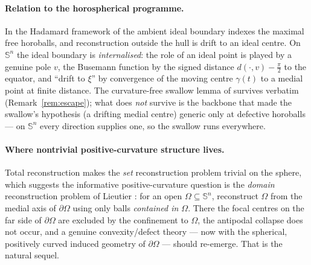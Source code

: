 \documentclass[11pt]{article}
\theoremstyle{remark}
\newcommand{\Sn}{\mathbb{S}^{n}}
\begin{document}
\paragraph{Relation to the horospherical programme.} In the Hadamard
framework of \cite{R3} the ambient ideal boundary indexes the maximal free
horoballs, and reconstruction outside the hull is drift to an ideal
centre. On $\Sn$ the ideal boundary is \emph{internalised}: the role of an
ideal point is played by a genuine pole $v$, the Busemann function by the
signed distance $d(\cdot,v)-\tfrac\pi2$ to the equator, and ``drift to
$\xi$'' by convergence of the moving centre $\gamma(t)$ to a medial point
at finite distance. The curvature-free swallow lemma of \cite{R3} survives
verbatim (Remark~\ref{rem:escape}); what does \emph{not} survive is the
backbone that made the swallow's hypothesis (a drifting medial centre)
generic only at defective horoballs --- on $\Sn$ every direction supplies
one, so the swallow runs everywhere.

\paragraph{Where nontrivial positive-curvature structure lives.} Total
reconstruction makes the \emph{set} reconstruction problem trivial on the
sphere, which suggests the informative positive-curvature question is the
\emph{domain} reconstruction problem of Lieutier \cite{Lie}: for an open
$\Omega\subseteq\Sn$, reconstruct $\Omega$ from the medial axis of
$\partial\Omega$ using only balls \emph{contained in $\Omega$}. There the
focal centres on the far side of $\partial\Omega$ are excluded by the
confinement to $\Omega$, the antipodal collapse does not occur, and a
genuine convexity/defect theory --- now with the spherical, positively
curved induced geometry of $\partial\Omega$ --- should re-emerge. That is
the natural sequel.
\end{document}
